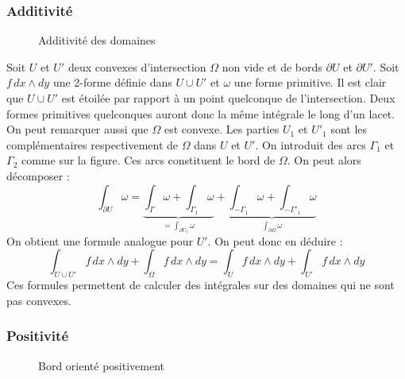 \subsubsection{Additivité}
\begin{figure}
 \centering
 
 \caption{Additivité des domaines}
 \label{fig:C2269_9}
\end{figure}
Soit $U$ et $U'$ deux convexes d'intersection $\Omega$ non vide et de bords $\partial U$ et $\partial U'$. Soit $f\,dx\wedge dy$ une 2-forme définie dans $U\cup U'$ et $\omega$ une forme primitive. Il est clair que $U\cup U'$ est étoilée par rapport à un point quelconque de l'intersection. Deux formes primitives quelconques auront donc la même intégrale le long d'un lacet. On peut remarquer aussi que $\Omega$ est convexe.\newline
 Les parties $U_1$ et $U'_1$ sont les complémentaires respectivement de $\Omega$ dans $U$ et $U'$. On introduit des arcs $\Gamma_1$ et $\Gamma_2$ comme sur la figure. Ces arcs constituent le bord de $\Omega$. On peut alors décomposer :
\begin{displaymath}
 \int_{\partial U}\omega = 
\underset{=\int_{\partial U_1}\omega}{\underbrace{\int_{\Gamma}\omega + \int_{\Gamma_1}\omega}} +
\underset{\int_{\partial \Omega}\omega}{\underbrace{\int_{ -\Gamma_1}\omega + \int_{- \Gamma'_1}\omega}}
\end{displaymath}
On obtient une formule analogue pour $U'$. On peut donc en déduire :
\begin{displaymath}
 \int_{U\cup U'}f\,dx\wedge dy + \int_{\Omega}f\,dx\wedge dy = \int_{U}f\,dx\wedge dy + \int_{U'}f\,dx\wedge dy
\end{displaymath}
Ces formules permettent de calculer des intégrales sur des domaines qui ne sont pas convexes.

\subsubsection{Positivité}
\begin{figure}
 \centering
 
 \caption{Bord orienté positivement}
 \label{fig:C2269_10}
\end{figure}

